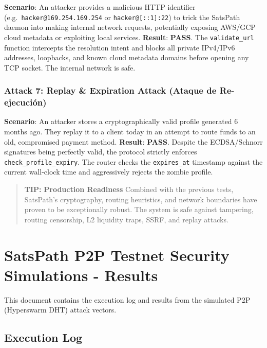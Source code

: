 \documentclass[
]{article}
\begin{document}
\textbf{Scenario}: An attacker provides a malicious HTTP identifier
(e.g.~\texttt{hacker@169.254.169.254} or \texttt{hacker@{[}::1{]}:22})
to trick the SatsPath daemon into making internal network requests,
potentially exposing AWS/GCP cloud metadata or exploiting local
services. \textbf{Result}: \textbf{PASS}. The \texttt{validate\_url}
function intercepts the resolution intent and blocks all private
IPv4/IPv6 addresses, loopbacks, and known cloud metadata domains before
opening any TCP socket. The internal network is safe.

\hypertarget{attack-7-replay-expiration-attack-ataque-de-re-ejecuciuxf3n}{%
\subsubsection{Attack 7: Replay \& Expiration Attack (Ataque de
Re-ejecución)}\label{attack-7-replay-expiration-attack-ataque-de-re-ejecuciuxf3n}}

\textbf{Scenario}: An attacker stores a cryptographically valid profile
generated 6 months ago. They replay it to a client today in an attempt
to route funds to an old, compromised payment method. \textbf{Result}:
\textbf{PASS}. Despite the ECDSA/Schnorr signatures being perfectly
valid, the protocol strictly enforces \texttt{check\_profile\_expiry}.
The router checks the \texttt{expires\_at} timestamp against the current
wall-clock time and aggressively rejects the zombie profile.

\begin{quote}
\textbf{TIP:} \textbf{Production Readiness} Combined with the previous
tests, SatsPath's cryptography, routing heuristics, and network
boundaries have proven to be exceptionally robust. The system is safe
against tampering, routing censorship, L2 liquidity traps, SSRF, and
replay attacks.
\end{quote}

\hypertarget{satspath-p2p-testnet-security-simulations---results}{%
\section{SatsPath P2P Testnet Security Simulations -
Results}\label{satspath-p2p-testnet-security-simulations---results}}

This document contains the execution log and results from the simulated
P2P (Hyperswarm DHT) attack vectors.

\hypertarget{execution-log-3}{%
\subsection{Execution Log}\label{execution-log-3}}
\end{document}
